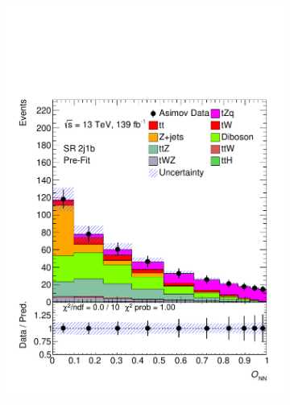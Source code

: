 \begin{figure}[!h] 
  \begin{subfigure}[b]{0.33\linewidth}
    \centering
    \includegraphics[width=\textwidth]{ubonn-thesis/Chapters/Chapters_07/Figure/Asmiov/SR_2j1b.pdf} 
  \end{subfigure}%
  \begin{subfigure}[b]{0.33\linewidth}
    \centering

\end{subfigure}
\end{figure}
